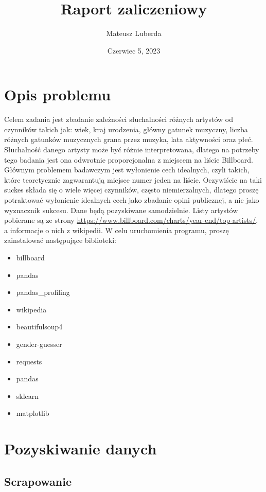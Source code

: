 \documentclass[12pt, letterpaper]{article}
\title{Raport zaliczeniowy}
\author{Mateusz Luberda }
\date{Czerwiec 5, 2023}
\begin{document}
\maketitle
\renewcommand*\contentsname{Spis treści}
\begingroup
  \flushbottom
  \tableofcontents
  \newpage
\endgroup

\section{Opis problemu}

Celem zadania jest zbadanie zależności słuchalności różnych artystów od czynników takich jak: wiek, kraj urodzenia, główny gatunek muzyczny, liczba różnych gatunków muzycznych grana przez muzyka, lata aktywności oraz płeć. Słuchalność danego artysty może być różnie interpretowana, dlatego na potrzeby tego badania jest ona odwrotnie proporcjonalna z miejscem na liście Billboard. Głównym problemem badawczym jest wyłonienie cech idealnych, czyli takich, które teoretycznie zagwarantują miejsce numer jeden na liście. Oczywiście na taki suckes składa się o wiele więcej czynników, często niemierzalnych, dlatego proszę potraktować wyłonienie idealnych cech jako zbadanie opini publicznej, a nie jako wyznacznik sukcesu. Dane będą pozyskiwane samodzielnie. Listy artystów pobierane są ze strony \url{https://www.billboard.com/charts/year-end/top-artists/}, a informacje o nich z wikipedii. W celu uruchomienia programu, proszę zainstalować następujące biblioteki:
\begin{itemize}
  \item billboard
  \item pandas
  \item pandas\_profiling
  \item wikipedia
  \item beautifulsoup4
  \item gender-guesser
  \item requests
  \item pandas
  \item sklearn
  \item matplotlib
\end{itemize}

\section{Pozyskiwanie danych}

\subsection{Scrapowanie}
\end{document}
